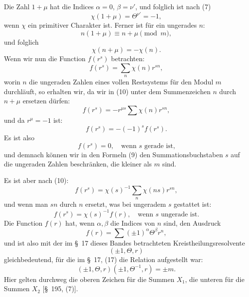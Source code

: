\documentclass[11pt]{article}
\begin{document}
Die Zahl $1+\mu$ hat die Indices $\alpha=0$, $\beta=\nu'$, und folglich ist nach (7)
\[
\chi(1+\mu)=\Theta^{\nu'}=-1,
\]
wenn $\chi$ ein primitiver Charakter ist. Ferner ist für ein ungerades $n$:
\[
n(1+\mu)\equiv n+\mu\pmod m,
\]
und folglich
\[
\chi(n+\mu)=-\chi(n).
\]
Wenn wir nun die Function $f(r^s)$ betrachten:
\begin{equation}
f(r^s)=\sum_n\chi(n)r^{sn},
\tag{10}
\end{equation}
worin $n$ die ungeraden Zahlen eines vollen Restsystems für den Modul $m$ durchläuft, so erhalten wir, da wir in (10) unter dem Summenzeichen $n$ durch $n+\mu$ ersetzen dürfen:
\[
f(r^s)=-r^{\mu s}\sum\chi(n)r^{sn},
\]
und da $r^\mu=-1$ ist:
\[
f(r^s)=-(-1)^sf(r^s).
\]
Es ist also
\begin{equation}
f(r^s)=0,\quad \text{wenn }s\text{ gerade ist,}
\tag{11}
\end{equation}
und demnach können wir in den Formeln (9) den Summationsbuchstaben $s$ auf die ungeraden Zahlen beschränken, die kleiner als $m$ sind.

Es ist aber nach (10):
\[
f(r^s)=\chi(s)^{-1}\sum_n\chi(ns)r^{sn},
\]
und wenn man $sn$ durch $n$ ersetzt, was bei ungeradem $s$ gestattet ist:
\begin{equation}
f(r^s)=\chi(s)^{-1}f(r),\quad \text{wenn }s\text{ ungerade ist.}
\tag{12}
\end{equation}
Die Function $f(r)$ hat, wenn $\alpha,\beta$ die Indices von $n$ sind, den Ausdruck
\begin{equation}
f(r)=\sum(\pm1)^\alpha\Theta^\beta r^n,
\tag{13}
\end{equation}
und ist also mit der im \S~17 dieses Bandes betrachteten Kreistheilungsresolvente
\[
(\pm1,\Theta,r)
\]
gleichbedeutend, für die im \S~17, (17) die Relation aufgestellt war:
\begin{equation}
(\pm1,\Theta,r)(\pm1,\Theta^{-1},r)=\pm m.
\tag{14}
\end{equation}
Hier gelten durchweg die oberen Zeichen für die Summen $X_1$, die unteren für die Summen $X_2$ [\S~195, (7)].
\end{document}
